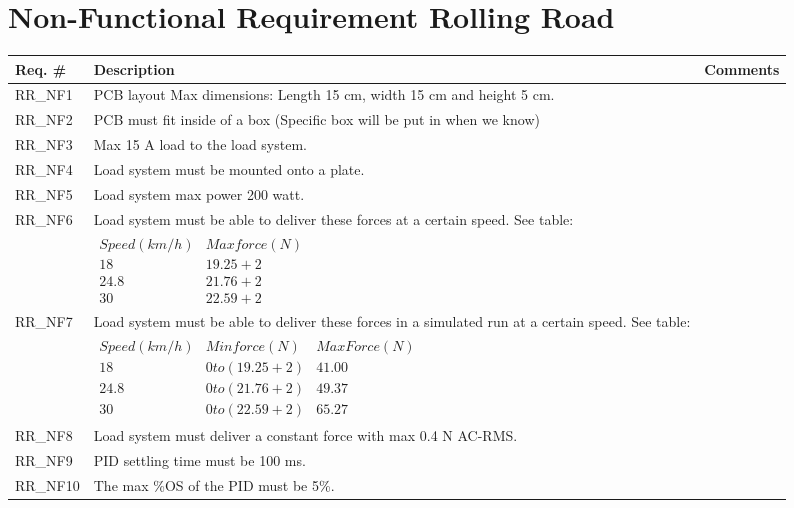 \section{Non-Functional Requirement Rolling Road}

\begin{table}[h!]
	\label{FREQ_AU2}
	\centering
	\begin{tabular}{|p{2 cm}|p{10 cm}|p{2 cm}|}
		\hline
		\textbf{Req. \#} & \textbf{Description} & \textbf{Comments} \\\hline
		RR\_NF1
		& PCB layout Max dimensions: Length 15 cm, width 15 cm and height 5 cm. 
		&  \\ \hline
		RR\_NF2
		& PCB must fit inside of a box (Specific box will be put in when we know)
		& \\ \hline
		RR\_NF3
		& Max 15 A load to the load system.
		& \\ \hline
		RR\_NF4
		& Load system must be mounted onto a plate. 
		& \\ \hline
		RR\_NF5
		& Load system max power 200 watt.
		& \\ \hline
		RR\_NF6 
		& Load system must be able to deliver these forces at a certain speed. See table: 
		& \\ &
		$\begin{array}{c|c}
			Speed (km/h) & Max force (N) \\ 
			18 & 19.25+2 \\ 
			24.8 & 21.76+2 \\ 
			30 & 22.59+2
		\end{array} $
		& \\ \hline
		RR\_NF7
		& Load system must be able to deliver these forces in a simulated run at a certain speed. See table:
		& \\ &
		$\begin{array}{c|c|c}
			Speed (km/h) & Min force (N) & Max Force (N) \\ 
			18 & 0 to (19.25+2) & 41.00 \\ 
			24.8 & 0 to (21.76+2) & 49.37 \\ 
			30 & 0 to (22.59+2) & 65.27
		\end{array}$
		& \\ \hline
		RR\_NF8
		& Load system must deliver a constant force with max 0.4 N AC-RMS. 
		& \\ \hline
		RR\_NF9
		& PID settling time must be 100 ms. 
		&  \\ \hline
		RR\_NF10
		& The max \%OS of the PID must be 5\%. 
		&  \\ \hline

\end{tabular}
\end{table}
